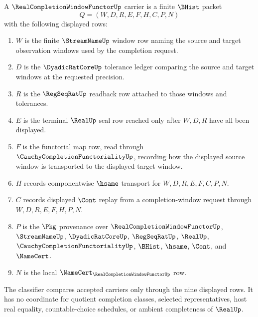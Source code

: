 \begin{definition}
\label{def:real-completion-window-functor-carrier}
A $\RealCompletionWindowFunctorUp$ carrier is a finite $\BHist$ packet
$$
Q=(W,D,R,E,F,H,C,P,N)
$$
with the following displayed rows:
\begin{enumerate}
\item $W$ is the finite $\StreamNameUp$ window row naming the source and target observation windows used by the completion request.
\item $D$ is the $\DyadicRatCoreUp$ tolerance ledger comparing the source and target windows at the requested precision.
\item $R$ is the $\RegSeqRatUp$ readback row attached to those windows and tolerances.
\item $E$ is the terminal $\RealUp$ seal row reached only after $W,D,R$ have all been displayed.
\item $F$ is the functorial map row, read through $\CauchyCompletionFunctorialityUp$, recording how the displayed source window is transported to the displayed target window.
\item $H$ records componentwise $\hsame$ transport for $W,D,R,E,F,C,P,N$.
\item $C$ records displayed $\Cont$ replay from a completion-window request through $W,D,R,E,F,H,P,N$.
\item $P$ is the $\Pkg$ provenance over $\RealCompletionWindowFunctorUp$, $\StreamNameUp$, $\DyadicRatCoreUp$, $\RegSeqRatUp$, $\RealUp$, $\CauchyCompletionFunctorialityUp$, $\BHist$, $\hsame$, $\Cont$, and $\NameCert$.
\item $N$ is the local $\NameCert_{\RealCompletionWindowFunctorUp}$ row.
\end{enumerate}
The classifier compares accepted carriers only through the nine displayed rows. It has no coordinate for quotient completion classes, selected representatives, host real equality, countable-choice schedules, or ambient completeness of $\RealUp$.
\end{definition}

